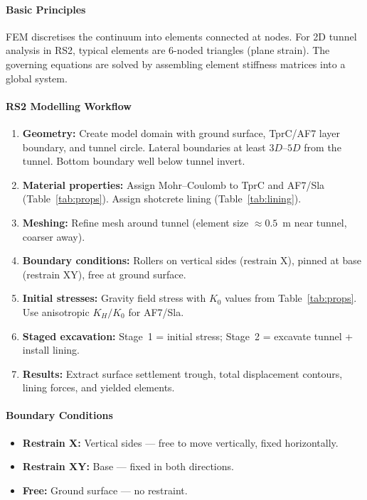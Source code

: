 \paragraph{Basic Principles}
FEM discretises the continuum into elements connected at nodes. For 2D tunnel analysis in RS2, typical elements are 6-noded triangles (plane strain). The governing equations are solved by assembling element stiffness matrices into a global system.

\paragraph{RS2 Modelling Workflow}
\begin{enumerate}
 \item \textbf{Geometry:} Create model domain with ground surface, TprC/AF7 layer boundary, and tunnel circle. Lateral boundaries at least $3D$--$5D$ from the tunnel. Bottom boundary well below tunnel invert.
 \item \textbf{Material properties:} Assign Mohr--Coulomb to TprC and AF7/Sla (Table~\ref{tab:props}). Assign shotcrete lining (Table~\ref{tab:lining}).
 \item \textbf{Meshing:} Refine mesh around tunnel (element size $\approx 0.5$~m near tunnel, coarser away).
 \item \textbf{Boundary conditions:} Rollers on vertical sides (restrain X), pinned at base (restrain XY), free at ground surface.
 \item \textbf{Initial stresses:} Gravity field stress with $K_0$ values from Table~\ref{tab:props}. Use anisotropic $K_H/K_0$ for AF7/Sla.
 \item \textbf{Staged excavation:} Stage~1 = initial stress; Stage~2 = excavate tunnel + install lining.
 \item \textbf{Results:} Extract surface settlement trough, total displacement contours, lining forces, and yielded elements.
\end{enumerate}

\paragraph{Boundary Conditions}
\begin{itemize}
 \item \textbf{Restrain X:} Vertical sides --- free to move vertically, fixed horizontally.
 \item \textbf{Restrain XY:} Base --- fixed in both directions.
 \item \textbf{Free:} Ground surface --- no restraint.
\end{itemize}

